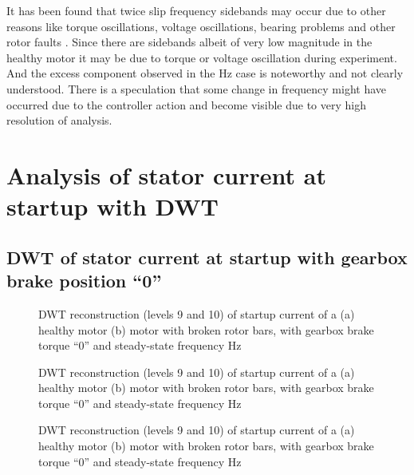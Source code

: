 \documentclass[a4paper,11pt]{report}
\begin{document}
It has been found that twice slip frequency sidebands may occur due to other reasons like torque oscillations, voltage oscillations, bearing problems and other rotor faults \cite{antonino}. Since there are sidebands albeit of very low magnitude in the healthy motor it may be due to torque or voltage oscillation during experiment. And the excess component observed in the \unit[50]{Hz} case is noteworthy and not clearly understood. There is a speculation that some change in frequency might have occurred due to the controller action and become visible due to very high resolution of analysis. 

\clearpage
\section{Analysis of stator current at startup with DWT}
\subsection{DWT of stator current at startup with gearbox brake position ``0''}

\begin{figure}[htbp]
\centering
\subfigure[]{\texttt{[image: h030st]}}
\subfigure[]{\texttt{[image: b030st]}}
\caption{DWT reconstruction (levels 9 and 10) of startup current of a (a) healthy motor (b) motor with broken rotor bars, with gearbox brake torque ``0'' and steady-state frequency \unit[30]{Hz}} \label{hb030st}
\end{figure}

\begin{figure}[htbp]
\centering
\subfigure[]{\texttt{[image: h040st]}}
\subfigure[]{\texttt{[image: b040st]}}
\caption{DWT reconstruction (levels 9 and 10) of startup current of a (a) healthy motor (b) motor with broken rotor bars, with gearbox brake torque ``0'' and steady-state frequency \unit[40]{Hz}} \label{hb040st}
\end{figure}

\begin{figure}[htbp]
\centering
\subfigure[]{\texttt{[image: h050st]}}
\subfigure[]{\texttt{[image: b050st]}}
\caption{DWT reconstruction (levels 9 and 10) of startup current of a (a) healthy motor (b) motor with broken rotor bars, with gearbox brake torque ``0'' and steady-state frequency \unit[50]{Hz}} \label{hb050st}
\end{figure}
\end{document}
